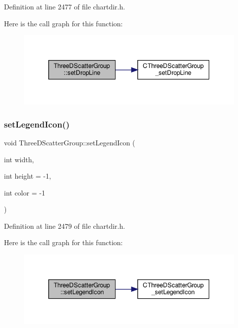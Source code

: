 Definition at line 2477 of file chartdir.\+h.

Here is the call graph for this function\+:
\nopagebreak
\begin{figure}[H]
\begin{center}
\leavevmode
\includegraphics[width=337pt]{class_three_d_scatter_group_a2b595091d992d417f3ff9cca595edc28_cgraph}
\end{center}
\end{figure}
\mbox{\label{class_three_d_scatter_group_a37983f9639976b290bc7c50b0382a1dc}} 
\subsubsection{\texorpdfstring{set\+Legend\+Icon()}{setLegendIcon()}}
{\footnotesize\ttfamily void Three\+D\+Scatter\+Group\+::set\+Legend\+Icon (\begin{DoxyParamCaption}\item[{int}]{width,  }\item[{int}]{height = {\ttfamily -\/1},  }\item[{int}]{color = {\ttfamily -\/1} }\end{DoxyParamCaption})\hspace{0.3cm}{\ttfamily [inline]}}



Definition at line 2479 of file chartdir.\+h.

Here is the call graph for this function\+:
\nopagebreak
\begin{figure}[H]
\begin{center}
\leavevmode
\includegraphics[width=337pt]{class_three_d_scatter_group_a37983f9639976b290bc7c50b0382a1dc_cgraph}
\end{center}
\end{figure}
\mbox{\label{class_three_d_scatter_group_a55fc5e93a7eed2319f694140c505cf2d}} 
